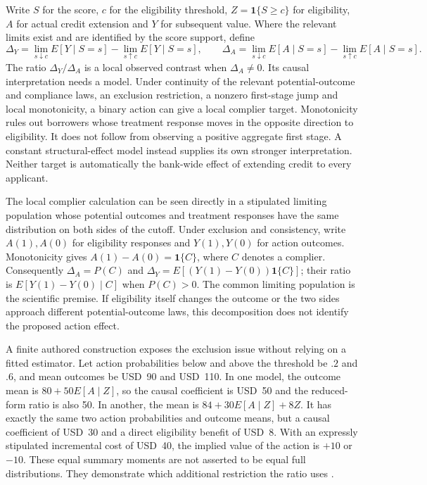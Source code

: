 Write $S$ for the score, $c$ for the eligibility threshold,
$Z=\mathbf 1\{S\ge c\}$ for eligibility, $A$ for actual credit extension
and $Y$ for subsequent value. Where the relevant limits exist and are
identified by the score support, define
\[
 \Delta_Y=\lim_{s\downarrow c}E[Y\mid S=s]
          -\lim_{s\uparrow c}E[Y\mid S=s],\qquad
 \Delta_A=\lim_{s\downarrow c}E[A\mid S=s]
          -\lim_{s\uparrow c}E[A\mid S=s].
\]
The ratio $\Delta_Y/\Delta_A$ is a local observed contrast when
$\Delta_A\ne0$. Its causal interpretation needs a model. Under continuity
of the relevant potential-outcome and compliance laws, an exclusion
restriction, a nonzero first-stage jump and local monotonicity, a binary
action can give a local complier target. Monotonicity rules out borrowers
whose treatment response moves in the opposite direction to eligibility.
It does not follow from observing a positive aggregate first stage. A
constant structural-effect model instead supplies its own stronger
interpretation. Neither target is automatically the bank-wide effect of
extending credit to every applicant.

The local complier calculation can be seen directly in a stipulated
limiting population whose potential outcomes and treatment responses
have the same distribution on both sides of the cutoff. Under exclusion
and consistency, write $A(1),A(0)$ for eligibility responses and
$Y(1),Y(0)$ for action outcomes. Monotonicity gives
$A(1)-A(0)=\mathbf 1\{C\}$, where $C$ denotes a complier. Consequently
$\Delta_A=P(C)$ and
$\Delta_Y=E[(Y(1)-Y(0))\mathbf 1\{C\}]$; their ratio is
$E[Y(1)-Y(0)\mid C]$ when $P(C)>0$. The common limiting population
is the scientific premise. If eligibility itself changes the outcome
or the two sides approach different potential-outcome laws, this
decomposition does not identify the proposed action effect.

A finite authored construction exposes the exclusion issue without relying
on a fitted estimator. Let action probabilities below and above the threshold
be $.2$ and $.6$, and mean outcomes be USD~90 and USD~110. In one model,
the outcome mean is $80+50E[A\mid Z]$, so the causal coefficient is USD~50
and the reduced-form ratio is also 50. In another, the mean is
$84+30E[A\mid Z]+8Z$. It has exactly the same two action probabilities
and outcome means, but a causal coefficient of USD~30 and a direct
eligibility benefit of USD~8. With an expressly stipulated incremental
cost of USD~40, the implied value of the action is $+10$ or $-10$.
These equal summary moments are not asserted to be equal full distributions.
They demonstrate which additional restriction the ratio uses
\citep{exec13_ivrd_exact}.

